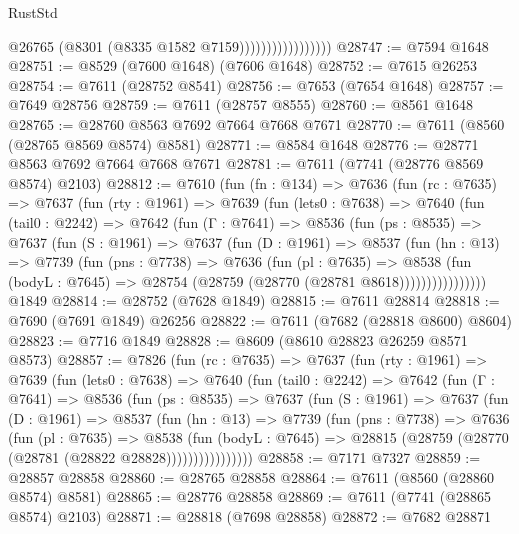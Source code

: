 \begin{lexlean}{RustStd}
\begin{coremodule}
{\begin{coremodule}
{{{{{{{{{{{{{{{{{{{{{{{{{{{{{{{{{{                                  @26765
                                  (@8301 (@8335 @1582 @7159)))))))))))))))))
@28747 := @7594 @1648
@28751 := @8529 (@7600 @1648) (@7606 @1648)
@28752 := @7615 @26253
@28754 := @7611 (@28752 @8541)
@28756 := @7653 (@7654 @1648)
@28757 := @7649 @28756
@28759 := @7611 (@28757 @8555)
@28760 := @8561 @1648
@28765 := @28760 @8563 @7692 @7664 @7668 @7671
@28770 := @7611 (@8560 (@28765 @8569 @8574) @8581)
@28771 := @8584 @1648
@28776 := @28771 @8563 @7692 @7664 @7668 @7671
@28781 := @7611 (@7741 (@28776 @8569 @8574) @2103)
@28812 := @7610
    (fun (fn : @134) =>
    @7636
      (fun (rc : @7635) =>
      @7637
        (fun (rty : @1961) =>
        @7639
          (fun (lets0 : @7638) =>
          @7640
            (fun (tail0 : @2242) =>
            @7642
              (fun (Γ : @7641) =>
              @8536
                (fun (ps : @8535) =>
                @7637
                  (fun (S : @1961) =>
                  @7637
                    (fun (D : @1961) =>
                    @8537
                      (fun (hn : @13) =>
                      @7739
                        (fun (pns : @7738) =>
                        @7636
                          (fun (pl : @7635) =>
                          @8538
                            (fun (bodyL : @7645) =>
                            @28754 (@28759 (@28770 (@28781 @8618))))))))))))))))
    @1849
@28814 := @28752 (@7628 @1849)
@28815 := @7611 @28814
@28818 := @7690 (@7691 @1849) @26256
@28822 := @7611 (@7682 (@28818 @8600) @8604)
@28823 := @7716 @1849
@28828 := @8609 (@8610 @28823 @26259 @8571 @8573)
@28857 := @7826
    (fun (rc : @7635) =>
    @7637
      (fun (rty : @1961) =>
      @7639
        (fun (lets0 : @7638) =>
        @7640
          (fun (tail0 : @2242) =>
          @7642
            (fun (Γ : @7641) =>
            @8536
              (fun (ps : @8535) =>
              @7637
                (fun (S : @1961) =>
                @7637
                  (fun (D : @1961) =>
                  @8537
                    (fun (hn : @13) =>
                    @7739
                      (fun (pns : @7738) =>
                      @7636
                        (fun (pl : @7635) =>
                        @8538
                          (fun (bodyL : @7645) =>
                          @28815 (@28759 (@28770 (@28781 (@28822 @28828))))))))))))))))
@28858 := @7171 @7327
@28859 := @28857 @28858
@28860 := @28765 @28858
@28864 := @7611 (@8560 (@28860 @8574) @8581)
@28865 := @28776 @28858
@28869 := @7611 (@7741 (@28865 @8574) @2103)
@28871 := @28818 (@7698 @28858)
@28872 := @7682 @28871
}}}}}}}}}}}}}}}}}}}}}}}}}}}}}}}}}}
\end{coremodule}}
\end{coremodule}
\end{lexlean}
